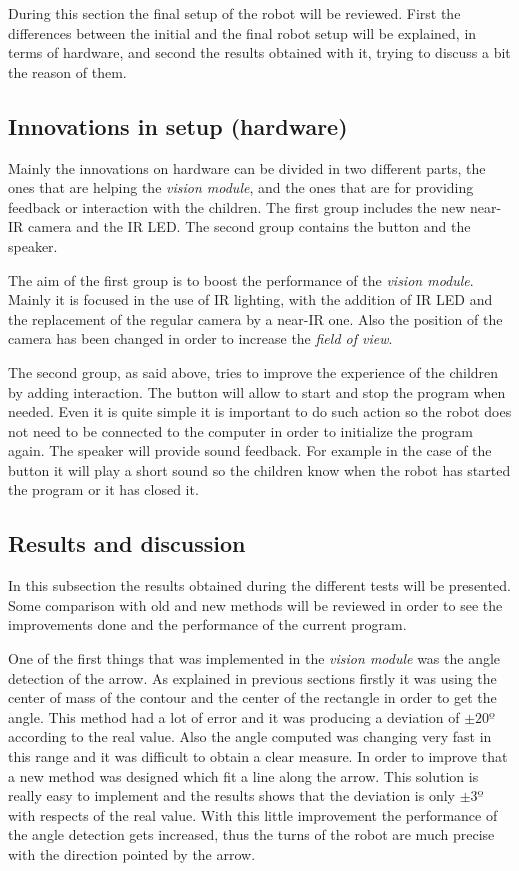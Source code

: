 During this section the final setup of the robot will be reviewed. First the differences between the initial and the final robot setup will be explained, in terms of hardware, and second the results obtained with it, trying to discuss a bit the reason of them.

\subsection{Innovations in setup (hardware)}

Mainly the innovations on hardware can be divided in two different parts, the ones that are helping the \textit{vision module}, and the ones that are for providing feedback or interaction with the children. The first group includes the new near-IR camera and the IR LED. The second group contains the button and the speaker.

The aim of the first group is to boost the performance of the \textit{vision module}. Mainly it is focused in the use of IR lighting, with the addition of IR LED and the replacement of the regular camera by a near-IR one. Also the position of the camera has been changed in order to increase the \textit{field of view}.

The second group, as said above, tries to improve the experience of the children by adding interaction. The button will allow to start and stop the program when needed. Even it is quite simple it is important to do such action so the robot does not need to be connected to the computer in order to initialize the program again. The speaker will provide sound feedback. For example in the case of the button it will play a short sound so the children know when the robot has started the program or it has closed it.


\subsection{Results and discussion}

In this subsection the results obtained during the different tests will be presented. Some comparison with old and new methods will be reviewed in order to see the improvements done and the performance of the current program. 

One of the first things that was implemented in the \textit{vision module} was the angle detection of the arrow. As explained in previous sections firstly it was using the center of mass of the contour and the center of the rectangle in order to get the angle. This method had a lot of error and it was producing a deviation of $\pm 20º$ according to the real value. Also the angle computed was changing very fast in this range and it was difficult to obtain a clear measure. In order to improve that a new method was designed which fit a line along the arrow. This solution is really easy to implement and the results shows that the deviation is only $\pm 3º$ with respects of the real value. With this little improvement the performance of the angle detection gets increased, thus the turns of the robot are much precise with the direction pointed by the arrow.

